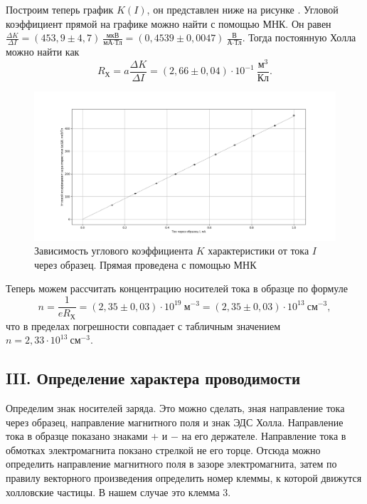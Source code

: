 \documentclass[a4paper,10pt]{article}
\begin{document}
Построим теперь график $K(I)$, он представлен ниже на рисунке . Угловой коэффициент прямой на графике можно найти с помощью МНК. Он равен $\frac{\Delta K}{\Delta I}=\left(453,9\pm4,7\right)~\frac{\text{мкВ}}{\text{мА}\cdot\text{Тл}}=\left(0,4539\pm0,0047\right)~\frac{\text{В}}{\text{А}\cdot\text{Тл}}$. Тогда постоянную Холла можно найти как\[R_{\text{Х}}=a\frac{\Delta K}{\Delta I}=\left(2,66\pm0,04\right)\cdot10^{-1}~\frac{\text{м}^3}{\text{Кл}}.\]

\begin{figure}[h]
	\centering
	\includegraphics[scale = 0.33]{hhhui}
	\caption{Зависимость углового коэффициента $K$ характеристики от тока $I$ через образец. Прямая проведена с помощью МНК} \label{hhhui}
\end{figure} 

Теперь можем рассчитать концентрацию носителей тока в образце по формуле\[n=\frac{1}{eR_{\text{Х}}}=\left(2,35\pm0,03\right)\cdot10^{19}~\text{м}^{-3}=\left(2,35\pm0,03\right)\cdot10^{13}~\text{см}^{-3},\]что в пределах погрешности совпадает с табличным значением $n=2,33\cdot10^{13}~\text{см}^{-3}$.

\subsection*{III. Определение характера проводимости}

Определим знак носителей заряда. Это можно сделать, зная направление тока через образец, направление магнитного поля и знак ЭДС Холла. Направление тока в образце показано знаками $+$ и $-$ на его держателе. Направление тока в обмотках электромагнита покзано стрелкой не его торце. Отсюда можно определить направление магнитного поля в зазоре электромагнита, затем по правилу векторного произведения определить номер клеммы, к которой движутся холловские частицы. В нашем случае это клемма 3.
\end{document}
